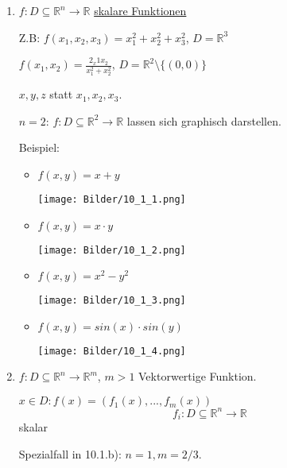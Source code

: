 \documentclass[a4paper, openany]{book}
\begin{document}
        \begin{enumerate}[label=(\alph*)]
          \item $f : D \subseteq \mathbb{R}^n \rightarrow \mathbb{R}$ \underline{skalare Funktionen}

          Z.B: $f(x_1, x_2, x_3) = x_1^2 + x_2^2 + x_3^2$, $D = \mathbb{R}^3$

          \par \medskip

          $f(x_1, x_2) = \frac{2_x1x_2}{x_1^2 + x_2^2}$, $D = \mathbb{R}^2 \setminus \{(0,0)\}$

          $x,y,z$ statt $x_1, x_2, x_3$.

          \par \medskip

          $n = 2$: $f: D \subseteq \mathbb{R}^2 \rightarrow \mathbb{R}$ lassen sich graphisch darstellen.

          \par \medskip

          Beispiel: 

          \begin{itemize}
            \item $f(x,y) = x+y$

            \texttt{[image: Bilder/10\_1\_1.png]}
            
            \item $f(x,y) = x \cdot y$


            \texttt{[image: Bilder/10\_1\_2.png]}
             
      
            \item $f(x,y) = x^2-y^2$

            \texttt{[image: Bilder/10\_1\_3.png]}

            \item $f(x,y) = sin(x) \cdot sin(y)$

              \texttt{[image: Bilder/10\_1\_4.png]}
          \end{itemize}

          \item $f: D \subseteq \mathbb{R}^n \rightarrow \mathbb{R}^m$, $m>1$ Vektorwertige Funktion.

          $x \in D : f(x) = (f_1(x), ..., f_m(x))$ \[ f_i : D \subseteq \mathbb{R}^n \rightarrow \mathbb{R} \] skalar

          \par \medskip

          Spezialfall in 10.1.b): $n = 1, m = 2/3$.
        \end{enumerate}
\end{document}
